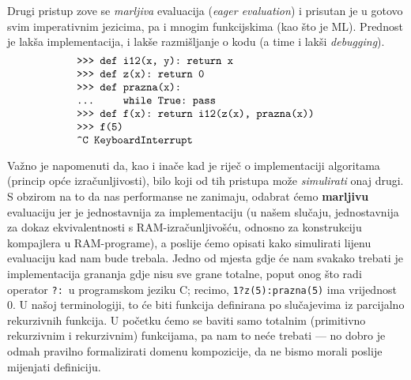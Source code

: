 Drugi pristup zove se \emph{marljiva} evaluacija (\emph{eager evaluation}) i prisutan je u gotovo svim imperativnim jezicima, pa i mnogim funkcijskima (kao što je ML). Prednost je lakša implementacija, i lakše razmišljanje o kodu (a time i lakši \emph{debugging}).
\begin{equation}\begin{minipage}{0.8\textwidth}
\begin{verbatim}
    >>> def i12(x, y): return x
    >>> def z(x): return 0
    >>> def prazna(x):
    ...     while True: pass
    >>> def f(x): return i12(z(x), prazna(x))
    >>> f(5)
    ^C KeyboardInterrupt
\end{verbatim}
\end{minipage}\end{equation}

Važno je napomenuti da, kao i inače kad je riječ o implementaciji algoritama (princip opće izračunljivosti), bilo koji od tih pristupa može \emph{simulirati} onaj drugi. S obzirom na to da nas performanse ne zanimaju, odabrat ćemo \textbf{marljivu} evaluaciju jer je jednostavnija za implementaciju (u našem slučaju, jednostavnija za dokaz ekvivalentnosti s RAM-izračunljivošću, odnosno za konstrukciju kompajlera u RAM-programe), a poslije ćemo opisati kako simulirati lijenu evaluaciju kad nam bude trebala. Jedno od mjesta gdje će nam svakako trebati je implementacija grananja gdje nisu sve grane totalne, poput onog što radi operator \texttt{?:}\ u programskom jeziku C; recimo, \texttt{1?z(5):prazna(5)} ima vrijednost $0$. U našoj terminologiji, to će biti funkcija definirana po slučajevima iz parcijalno rekurzivnih funkcija. U početku ćemo se baviti samo totalnim (primitivno rekurzivnim i rekurzivnim) funkcijama, pa nam to neće trebati --- no dobro je odmah pravilno formalizirati domenu kompozicije, da ne bismo morali poslije mijenjati definiciju.

